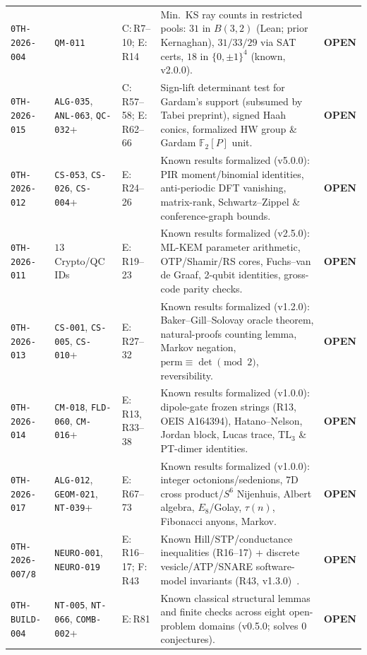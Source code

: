 \documentclass[11pt,reqno]{amsart}
\theoremstyle{plain}
\theoremstyle{definition}
\newcommand{\tcode}[1]{{\scriptsize\nolinkurl{#1}}}
\begin{document}
\begin{table}[t]
\begin{tabularx}{\textwidth}{@{}P{2.35cm}P{1.80cm}P{1.75cm}YP{1.05cm}@{}}
\tcode{0TH-2026-004} & \tcode{QM-011} & C:\,R7--10; E:\,R14 & Min.\ KS ray counts in restricted pools: $31$ in $B(3,2)$ (Lean; prior Kernaghan), $31/33/29$ via SAT certs, $18$ in $\{0,\pm 1\}^4$ (known, v2.0.0). & \textbf{OPEN} \\
\tcode{0TH-2026-015} & \tcode{ALG-035}, \tcode{ANL-063}, \tcode{QC-032}+ & C:\,R57--58; E:\,R62--66 & Sign-lift determinant test for Gardam's support (subsumed by Tabei preprint), signed Haah conics, formalized HW group \& Gardam $\mathbb{F}_2[P]$ unit. & \textbf{OPEN} \\
\tcode{0TH-2026-012} & \tcode{CS-053}, \tcode{CS-026}, \tcode{CS-004}+ & E:\,R24--26 & Known results formalized (v5.0.0): PIR moment/binomial identities, anti-periodic DFT vanishing, matrix-rank, Schwartz--Zippel \& conference-graph bounds. & \textbf{OPEN} \\
\tcode{0TH-2026-011} & $13$ Crypto/QC IDs & E:\,R19--23 & Known results formalized (v2.5.0): ML-KEM parameter arithmetic, OTP/Shamir/RS cores, Fuchs--van de Graaf, 2-qubit identities, gross-code parity checks. & \textbf{OPEN} \\
\tcode{0TH-2026-013} & \tcode{CS-001}, \tcode{CS-005}, \tcode{CS-010}+ & E:\,R27--32 & Known results formalized (v1.2.0): Baker--Gill--Solovay oracle theorem, natural-proofs counting lemma, Markov negation, $\mathrm{perm}\equiv\det\pmod 2$, reversibility. & \textbf{OPEN} \\
\tcode{0TH-2026-014} & \tcode{CM-018}, \tcode{FLD-060}, \tcode{CM-016}+ & E:\,R13, R33--38 & Known results formalized (v1.0.0): dipole-gate frozen strings (R13, OEIS A164394), Hatano--Nelson, Jordan block, Lucas trace, $\mathrm{TL}_3$ \& PT-dimer identities. & \textbf{OPEN} \\
\tcode{0TH-2026-017} & \tcode{ALG-012}, \tcode{GEOM-021}, \tcode{NT-039}+ & E:\,R67--73 & Known results formalized (v1.0.0): integer octonions/sedenions, 7D cross product/$S^6$ Nijenhuis, Albert algebra, $E_8$/Golay, $\tau(n)$, Fibonacci anyons, Markov. & \textbf{OPEN} \\
\tcode{0TH-2026-007/8} & \tcode{NEURO-001}, \tcode{NEURO-019} & E:\,R16--17; F:\,R43 & Known Hill/STP/conductance inequalities (R16--17) + discrete vesicle/ATP/SNARE software-model invariants (R43, v1.3.0)~\cite{donahue2026synapse}. & \textbf{OPEN} \\
\tcode{0TH-BUILD-004} & \tcode{NT-005}, \tcode{NT-066}, \tcode{COMB-002}+ & E:\,R81 & Known classical structural lemmas and finite checks across eight open-problem domains (v0.5.0; solves $0$ conjectures). & \textbf{OPEN} \\

\end{tabularx}
\end{table}
\end{document}
